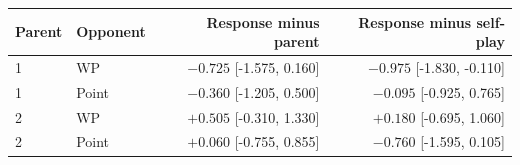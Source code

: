 \begin{tabular}{llrr}
\toprule
Parent & Opponent & Response minus parent & Response minus self-play \\
\midrule
1 & WP & $-0.725$ [-1.575, 0.160] & $-0.975$ [-1.830, -0.110] \\
1 & Point & $-0.360$ [-1.205, 0.500] & $-0.095$ [-0.925, 0.765] \\
2 & WP & $+0.505$ [-0.310, 1.330] & $+0.180$ [-0.695, 1.060] \\
2 & Point & $+0.060$ [-0.755, 0.855] & $-0.760$ [-1.595, 0.105] \\
\bottomrule
\end{tabular}
